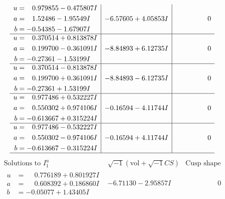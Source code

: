 \documentclass[1p]{elsarticle_modified}
\theoremstyle{definition}
\newcommand{\I}{\sqrt{-1}}
\begin{document}
$$\begin{array}{c|c|c}
\begin{aligned}
u &= \phantom{-}0.979855 - 0.475807 I \\
a &= \phantom{-}1.52486 - 1.95549 I \\
b &= -0.54385 - 1.67907 I\end{aligned}
 & -6.57605 + 4.05853 I & \phantom{-0.000000 } 0 \\ \hline\begin{aligned}
u &= \phantom{-}0.370514 + 0.813878 I \\
a &= \phantom{-}0.199700 - 0.361091 I \\
b &= -0.27361 - 1.53199 I\end{aligned}
 & -8.84893 + 6.12735 I & \phantom{-0.000000 } 0 \\ \hline\begin{aligned}
u &= \phantom{-}0.370514 - 0.813878 I \\
a &= \phantom{-}0.199700 + 0.361091 I \\
b &= -0.27361 + 1.53199 I\end{aligned}
 & -8.84893 - 6.12735 I & \phantom{-0.000000 } 0 \\ \hline\begin{aligned}
u &= \phantom{-}0.977486 + 0.532227 I \\
a &= \phantom{-}0.550302 + 0.974106 I \\
b &= -0.613667 + 0.315224 I\end{aligned}
 & -0.16594 - 4.11744 I & \phantom{-0.000000 } 0 \\ \hline\begin{aligned}
u &= \phantom{-}0.977486 - 0.532227 I \\
a &= \phantom{-}0.550302 - 0.974106 I \\
b &= -0.613667 - 0.315224 I\end{aligned}
 & -0.16594 + 4.11744 I & \phantom{-0.000000 } 0\\
 \hline 
 \end{array}$$\newpage$$\begin{array}{c|c|c}  
\text{Solutions to }I^u_{1}& \I (\text{vol} + \sqrt{-1}CS) & \text{Cusp shape}\\
 \hline 
\begin{aligned}
u &= \phantom{-}0.776189 + 0.801927 I \\
a &= \phantom{-}0.608392 + 0.186860 I \\
b &= -0.05077 + 1.43405 I\end{aligned}
 & -6.71130 - 2.95857 I & \phantom{-0.000000 } 0 \\ \hline\begin{aligned}

\end{aligned}
\end{array}$$
\end{document}
